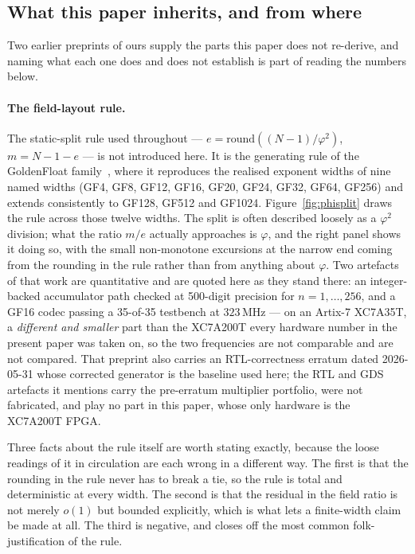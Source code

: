 \documentclass[11pt]{article}
\theoremstyle{definition}
\begin{document}
\subsection{What this paper inherits, and from where}\label{sec:prior}

Two earlier preprints of ours supply the parts this paper does not re-derive, and
naming what each one does and does not establish is part of reading the numbers
below.

\paragraph{The field-layout rule.} The static-split rule used throughout ---
$e=\mathrm{round}((N-1)/\varphi^{2})$, $m=N-1-e$ --- is not introduced here. It
is the generating rule of the GoldenFloat family~\cite{goldenfloat}, where it
reproduces the realised exponent widths of nine named widths (GF4, GF8, GF12,
GF16, GF20, GF24, GF32, GF64, GF256) and extends consistently to GF128, GF512
and GF1024. Figure~\ref{fig:phisplit} draws the rule across those twelve widths.
The split is often described loosely as a $\varphi^{2}$ division; what the ratio
$m/e$ actually approaches is $\varphi$, and the right panel shows it doing so,
with the small non-monotone excursions at the narrow end coming from the rounding
in the rule rather than from anything about $\varphi$. Two artefacts of that work
are quantitative and are quoted here as they stand there: an integer-backed
accumulator path checked at 500-digit precision for $n=1,\dots,256$, and a GF16
codec passing a 35-of-35 testbench at $323$\,MHz --- on an Artix-7 XC7A35T, a
\emph{different and smaller} part than the XC7A200T every hardware number in the
present paper was taken on, so the two frequencies are not comparable and are
not compared. That preprint also carries an RTL-correctness erratum dated
2026-05-31 whose corrected generator is the baseline used here; the RTL and GDS
artefacts it mentions carry the pre-erratum multiplier portfolio, were not
fabricated, and play no part in this paper, whose only hardware is the XC7A200T
FPGA.

Three facts about the rule itself are worth stating exactly, because the loose
readings of it in circulation are each wrong in a different way. The first is that
the rounding in the rule never has to break a tie, so the rule is total and
deterministic at every width. The second is that the residual in the field ratio
is not merely $o(1)$ but bounded explicitly, which is what lets a finite-width
claim be made at all. The third is negative, and closes off the most common
folk-justification of the rule.
\end{document}
